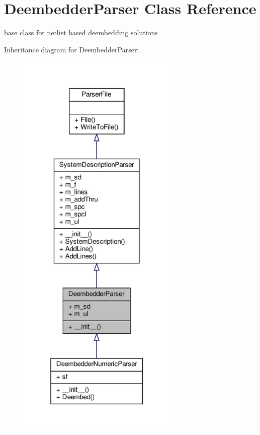 \hypertarget{classSignalIntegrity_1_1Parsers_1_1DeembedderParser_1_1DeembedderParser}{}\section{Deembedder\+Parser Class Reference}
\label{classSignalIntegrity_1_1Parsers_1_1DeembedderParser_1_1DeembedderParser}


base class for netlist based deembedding solutions  




Inheritance diagram for Deembedder\+Parser\+:
\nopagebreak
\begin{figure}[H]
\begin{center}
\leavevmode
\includegraphics[height=550pt]{classSignalIntegrity_1_1Parsers_1_1DeembedderParser_1_1DeembedderParser__inherit__graph}
\end{center}
\end{figure}



